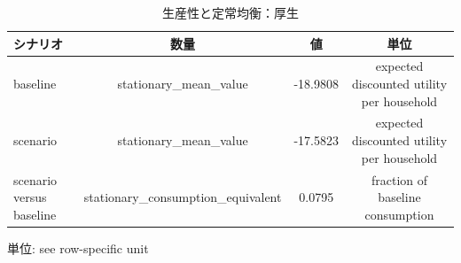\begingroup
\begin{table}[htbp]
\centering
\caption{生産性と定常均衡：厚生}
\label{tab:specialist-aiyagari-r01-displays-welfare}
\begin{tabular}{lccc}
\toprule
シナリオ & 数量 & 値 & 単位 \\
\midrule
baseline & stationary\_mean\_value & -18.9808 & expected discounted utility per household \\
scenario & stationary\_mean\_value & -17.5823 & expected discounted utility per household \\
scenario versus baseline & stationary\_consumption\_equivalent & 0.0795 & fraction of baseline consumption \\
\bottomrule
\end{tabular}
\par\medskip\begin{minipage}{\linewidth}\footnotesize
単位: see row-specific unit
\end{minipage}
\end{table}
\endgroup
